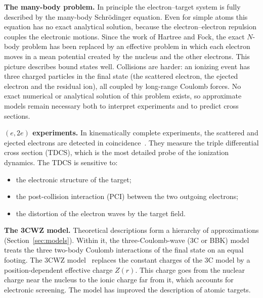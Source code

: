 \documentclass[11pt,a4paper]{article}
\begin{document}
\textbf{The many-body problem.} In principle the electron--target system is fully described by
the many-body Schr\"odinger equation. Even for simple atoms this equation has no exact
analytical solution, because the electron--electron repulsion couples the electronic motions.
Since the work of Hartree and Fock, the exact $N$-body problem has been replaced by an effective
problem in which each electron moves in a mean potential created by the nucleus and the other
electrons. This picture describes bound states well. Collisions are harder: an ionizing event
has three charged particles in the final state (the scattered electron, the ejected electron and
the residual ion), all coupled by long-range Coulomb forces. No exact numerical or analytical
solution of this problem exists, so approximate models remain necessary both to interpret
experiments and to predict cross sections.

\textbf{$(e,2e)$ experiments.} In kinematically complete experiments, the scattered and ejected
electrons are detected in coincidence~\cite{Ehrhardt1969,LahmamBennani1991}. They measure the
triple differential cross section (TDCS), which is the most detailed probe of the ionization
dynamics. The TDCS is sensitive to:
\begin{itemize}
\item the electronic structure of the target;
\item the post-collision interaction (PCI) between the two outgoing electrons;
\item the distortion of the electron waves by the target field.
\end{itemize}

\textbf{The 3CWZ model.} Theoretical descriptions form a hierarchy of approximations
(Section~\ref{sec:models}). Within it, the three-Coulomb-wave (3C or BBK)
model~\cite{Brauner1989} treats the three two-body Coulomb interactions of the final state on an
equal footing. The 3CWZ model~\cite{Bechane2024,Tamin2024,Zaidi2024} replaces the constant
charges of the 3C model by a position-dependent effective charge $Z(r)$. This charge goes from
the nuclear charge near the nucleus to the ionic charge far from it, which accounts for
electronic screening. The model has improved the description of atomic targets.
\end{document}
